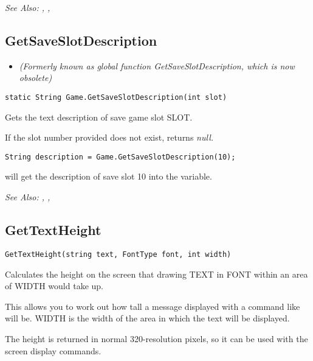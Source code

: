 \it{See Also:} ,
,


\subsection{GetSaveSlotDescription}\label{Game.GetSaveSlotDescription}%

\begin{itemize}
\item \it{(Formerly known as global function GetSaveSlotDescription, which is now obsolete)}
\end{itemize}

\begin{verbatim}
static String Game.GetSaveSlotDescription(int slot)
\end{verbatim}
Gets the text description of save game slot SLOT.

If the slot number provided does not exist, returns \it{null}.

\begin{verbatim}
String description = Game.GetSaveSlotDescription(10);
\end{verbatim}
will get the description of save slot 10 into the variable.

\it{See Also:} ,
, 


\subsection{GetTextHeight}\label{GetTextHeight}%

\begin{verbatim}
GetTextHeight(string text, FontType font, int width)
\end{verbatim}
Calculates the height on the screen that drawing TEXT in FONT within an area of WIDTH
would take up.

This allows you to work out how tall a message displayed with a command like
 will be. WIDTH is
the width of the area in which the text will be displayed.

The height is returned in normal 320-resolution pixels, so it can be used with the
screen display commands.

